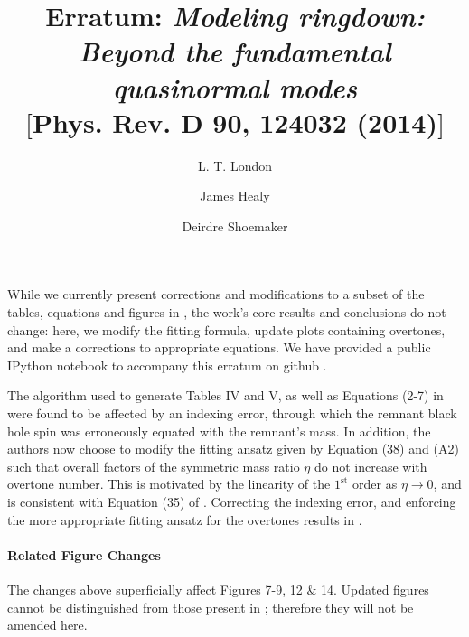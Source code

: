 \documentclass[notitlepage,prd,article,floatfix,preprintnumbers,a4paper,nofootinbib,superscriptaddress]{revtex4-1}
\begin{document}

\title{Erratum: \textit{Modeling ringdown: Beyond the fundamental quasinormal modes}\\
$[$Phys. Rev. D 90, 124032 (2014)$]$}

\author{L. T. London}
 \author{James Healy}
 \author{Deirdre Shoemaker}


{\let\newpage\relax\maketitle}

%
\par While we currently present corrections and modifications to a subset of the tables, equations and figures in \cite{London:2014cma}, the work's core results and conclusions do not change: here, we modify the fitting formula, update plots containing overtones, and make a corrections to appropriate equations.
%
We have provided a public IPython notebook to accompany this erratum on github \cite{London:2016git}.
%
\par The algorithm used to generate Tables IV and V, as well as Equations (2-7) in \cite{London:2014cma} were found to be affected by an indexing error, through which the remnant black hole spin was erroneously equated with the remnant's mass.
%
In addition, the authors now choose to modify the fitting ansatz given by Equation (38) and (A2) such that overall factors of the symmetric mass ratio $\eta$ do not increase with overtone number.
%
This is motivated by the linearity of the $1^{\mathrm{st}}$ order  as $\eta \rightarrow 0$, and is consistent with Equation (35) of \cite{London:2014cma}.
%
Correcting the indexing error, and enforcing the more appropriate fitting ansatz for the overtones results in .
%

%
\paragraph*{Related Figure Changes --} The changes above superficially affect Figures 7-9, 12 \& 14. Updated figures cannot be distinguished from those present in \cite{London:2014cma}; therefore they will not be amended here.
%
\end{document}
